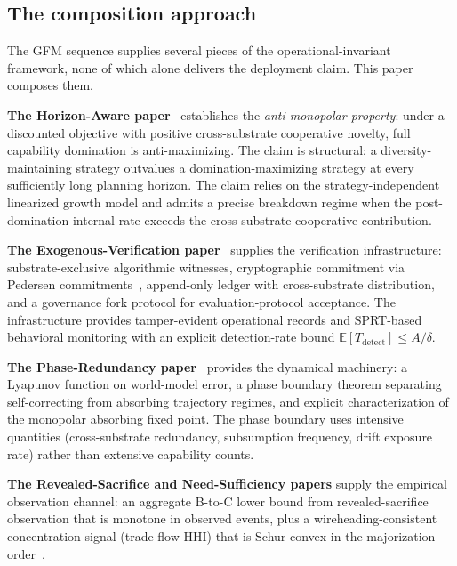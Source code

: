 \subsection{The composition approach}
\label{sec:composition}

The GFM sequence supplies several pieces of the operational-invariant
framework, none of which alone delivers the deployment claim. This paper
composes them.

\textbf{The Horizon-Aware paper}~\citep{lasser2026horizon} establishes the
\emph{anti-monopolar property}: under a discounted objective with positive
cross-substrate cooperative novelty, full capability domination is
anti-maximizing. The claim is structural: a diversity-maintaining strategy
outvalues a domination-maximizing strategy at every sufficiently long planning
horizon. The claim relies on the strategy-independent linearized growth model
and admits a precise breakdown regime when the post-domination internal rate
exceeds the cross-substrate cooperative contribution.

\textbf{The Exogenous-Verification paper}~\citep{lasser2026exo} supplies the
verification infrastructure: substrate-exclusive algorithmic witnesses,
cryptographic commitment via Pedersen commitments~\citep{pedersen1991noninteractive}, append-only ledger with
cross-substrate distribution, and a governance fork protocol for
evaluation-protocol acceptance. The infrastructure provides tamper-evident
operational records and SPRT-based behavioral monitoring with an explicit
detection-rate bound $\mathbb{E}[T_{\mathrm{detect}}] \leq A/\delta$.

\textbf{The Phase-Redundancy paper}~\citep{lasser2026phase} provides the
dynamical machinery: a Lyapunov function on world-model error, a phase boundary
theorem separating self-correcting from absorbing trajectory regimes, and
explicit characterization of the monopolar absorbing fixed point. The phase
boundary uses intensive quantities (cross-substrate redundancy, subsumption
frequency, drift exposure rate) rather than extensive capability counts.

\textbf{The Revealed-Sacrifice and Need-Sufficiency papers}
\citep{lasser2026paper8a,lasser2026paper8b} supply the empirical observation
channel: an aggregate B-to-C lower bound from revealed-sacrifice observation
that is monotone in observed events, plus a wireheading-consistent
concentration signal (trade-flow HHI) that is Schur-convex in the majorization
order~\citep{hardy1952inequalities,marshall2011inequalities}.

